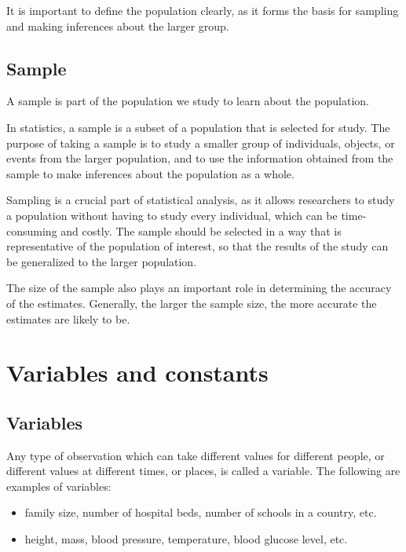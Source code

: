 \documentclass[
]{book}
\begin{document}
It is important to define the population clearly, as it forms the basis for sampling and making inferences about the larger group.

\hypertarget{sample}{%
\subsection{Sample}\label{sample}}

A sample is part of the population we study to learn about the
population.

In statistics, a sample is a subset of a population that is selected for study. The purpose of taking a sample is to study a smaller group of individuals, objects, or events from the larger population, and to use the information obtained from the sample to make inferences about the population as a whole.

Sampling is a crucial part of statistical analysis, as it allows researchers to study a population without having to study every individual, which can be time-consuming and costly. The sample should be selected in a way that is representative of the population of interest, so that the results of the study can be generalized to the larger population.

The size of the sample also plays an important role in determining the accuracy of the estimates. Generally, the larger the sample size, the more accurate the estimates are likely to be.

\hypertarget{variables-and-constants}{%
\section{Variables and constants}\label{variables-and-constants}}

\hypertarget{variables}{%
\subsection{Variables}\label{variables}}

Any type of observation which can take different values for different
people, or different values at different times, or places, is called a
variable. The following are examples of variables:

\begin{itemize}
\item
  family size, number of hospital beds, number of schools in a
  country, etc.
\item
  height, mass, blood pressure, temperature, blood glucose level, etc.
\end{itemize}
\end{document}
